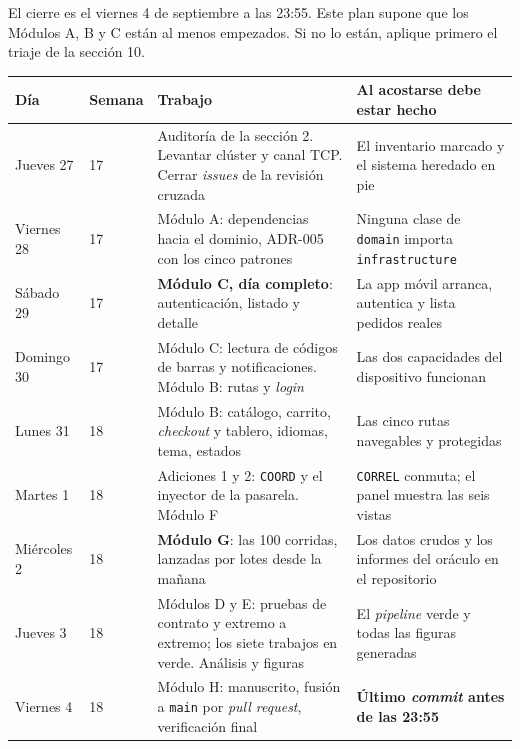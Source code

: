 \documentclass[11pt,a4paper]{article}
\begin{document}
El cierre es el viernes 4 de septiembre a las 23:55. Este plan supone que los Módulos A, B y C están al menos empezados. Si no lo están, aplique primero el triaje de la sección 10.

\begin{center}
	\small
	\begin{longtable}{@{}p{2.6cm}p{1.5cm}p{5.2cm}p{5.0cm}@{}}
		\toprule
		\textbf{Día} & \textbf{Semana} & \textbf{Trabajo} & \textbf{Al acostarse debe estar hecho} \\
		\midrule
		\endhead
		Jueves 27 & 17 & Auditoría de la sección 2. Levantar clúster y canal TCP. Cerrar \emph{issues} de la revisión cruzada & El inventario marcado y el sistema heredado en pie \\
		\addlinespace
		Viernes 28 & 17 & Módulo A: dependencias hacia el dominio, ADR-005 con los cinco patrones & Ninguna clase de \texttt{domain} importa \texttt{infrastructure} \\
		\addlinespace
		Sábado 29 & 17 & \textbf{Módulo C, día completo}: autenticación, listado y detalle & La app móvil arranca, autentica y lista pedidos reales \\
		\addlinespace
		Domingo 30 & 17 & Módulo C: lectura de códigos de barras y notificaciones. Módulo B: rutas y \emph{login} & Las dos capacidades del dispositivo funcionan \\
		\addlinespace
		Lunes 31 & 18 & Módulo B: catálogo, carrito, \emph{checkout} y tablero, idiomas, tema, estados & Las cinco rutas navegables y protegidas \\
		\addlinespace
		Martes 1 & 18 & Adiciones 1 y 2: \texttt{COORD} y el inyector de la pasarela. Módulo F & \texttt{CORREL} conmuta; el panel muestra las seis vistas \\
		\addlinespace
		Miércoles 2 & 18 & \textbf{Módulo G}: las 100 corridas, lanzadas por lotes desde la mañana & Los datos crudos y los informes del oráculo en el repositorio \\
		\addlinespace
		Jueves 3 & 18 & Módulos D y E: pruebas de contrato y extremo a extremo; los siete trabajos en verde. Análisis y figuras & El \emph{pipeline} verde y todas las figuras generadas \\
		\addlinespace
		Viernes 4 & 18 & Módulo H: manuscrito, fusión a \texttt{main} por \emph{pull request}, verificación final & \textbf{Último \emph{commit} antes de las 23:55} \\
		\bottomrule
	\end{longtable}
\end{center}
\end{document}
